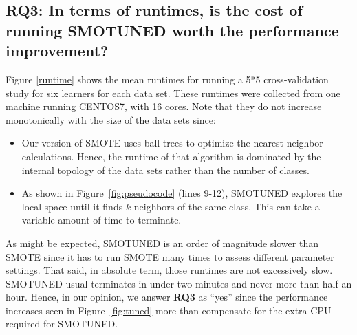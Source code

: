 \documentclass[10pt,conference]{IEEEtran}
\newcommand{\bi}{\begin{itemize}[leftmargin=0.4cm]}
\newcommand{\ei}{\end{itemize}}
\theoremstyle{break}
\theoremstyle{break}
\begin{document}
\subsection{{\bf RQ3:} In  terms  of  runtimes,  is  the  cost  of  running  SMOTUNED worth the performance improvement?}

Figure \ref{runtime} shows the mean runtimes
for running a 5*5 cross-validation study for six learners for each data set.
These runtimes were collected from one machine running CENTOS7, with 16 cores.
Note that they do not increase monotonically with the size of the data sets since:
\bi
\item Our version of SMOTE uses ball trees to optimize the nearest neighbor calculations. Hence, the runtime of that algorithm is dominated by the internal topology of the data sets rather than the number of classes.
\item
As shown in 
Figure~\ref{fig:pseudocode} (lines 9-12),
SMOTUNED explores the local space until it finds $k$ neighbors of the same class. This can take a variable amount of time to terminate.
\ei
As might be expected,  SMOTUNED is an order of magnitude slower than SMOTE since
it has to run SMOTE many times to assess different parameter settings.
That said, in absolute term, those runtimes are not excessively slow.
SMOTUNED usual terminates in under two minutes and never more than half an hour.
Hence, in  our opinion, we answer {\bf RQ3} as ``yes'' since the   performance increases
seen in Figure~\ref{fig:tuned} more than compensate for the extra CPU required for SMOTUNED.
 
\end{document}
